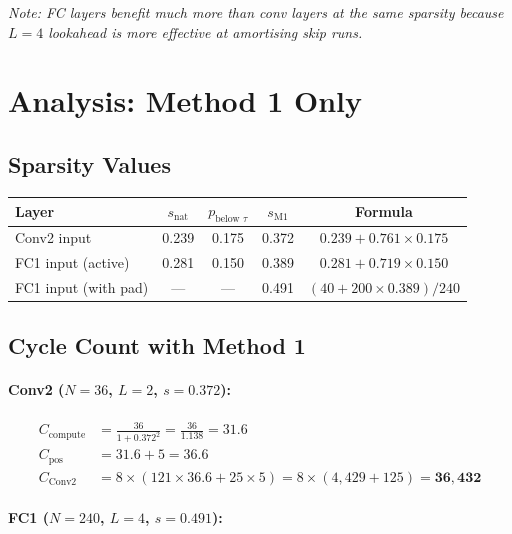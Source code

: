\documentclass[11pt,a4paper]{article}
\begin{document}
\noindent\textit{Note: FC layers benefit much more than conv layers at the same sparsity
because $L=4$ lookahead is more effective at amortising skip runs.}


\section{Analysis: Method 1 Only}
\label{sec:m1only}

\subsection{Sparsity Values}

\begin{center}
\begin{tabular}{lcccc}
\toprule
\textbf{Layer} & $s_{\text{nat}}$ & $p_{\text{below } \tau}$ & $s_{\text{M1}}$ & \textbf{Formula} \\
\midrule
Conv2 input & 0.239 & 0.175 & 0.372 & $0.239 + 0.761 \times 0.175$ \\
FC1 input (active) & 0.281 & 0.150 & 0.389 & $0.281 + 0.719 \times 0.150$ \\
FC1 input (with pad) & — & — & 0.491 & $(40 + 200 \times 0.389)/240$ \\
\bottomrule
\end{tabular}
\end{center}

\subsection{Cycle Count with Method 1}

\paragraph{Conv2 ($N=36$, $L=2$, $s=0.372$):}
\begin{align}
C_{\text{compute}} &= \frac{36}{1 + 0.372^2} = \frac{36}{1.138} = 31.6 \\
C_{\text{pos}} &= 31.6 + 5 = 36.6 \\
C_{\text{Conv2}} &= 8 \times (121 \times 36.6 + 25 \times 5)
= 8 \times (4{,}429 + 125) = \mathbf{36{,}432}
\end{align}

\paragraph{FC1 ($N=240$, $L=4$, $s=0.491$):}
\end{document}
